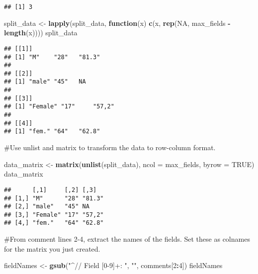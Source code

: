 \documentclass[
]{article}
\newenvironment{Shaded}{\begin{snugshade}}{\end{snugshade}}
\newcommand{\AttributeTok}[1]{\textcolor[rgb]{0.13,0.29,0.53}{#1}}
\newcommand{\ConstantTok}[1]{\textcolor[rgb]{0.56,0.35,0.01}{#1}}
\newcommand{\ControlFlowTok}[1]{\textcolor[rgb]{0.13,0.29,0.53}{\textbf{#1}}}
\newcommand{\DecValTok}[1]{\textcolor[rgb]{0.00,0.00,0.81}{#1}}
\newcommand{\FunctionTok}[1]{\textcolor[rgb]{0.13,0.29,0.53}{\textbf{#1}}}
\newcommand{\NormalTok}[1]{#1}
\newcommand{\OtherTok}[1]{\textcolor[rgb]{0.56,0.35,0.01}{#1}}
\newcommand{\SpecialCharTok}[1]{\textcolor[rgb]{0.81,0.36,0.00}{\textbf{#1}}}
\newcommand{\StringTok}[1]{\textcolor[rgb]{0.31,0.60,0.02}{#1}}
\begin{document}
\begin{verbatim}
## [1] 3
\end{verbatim}

\begin{Shaded}
\begin{Highlighting}[]
\NormalTok{split\_data }\OtherTok{\textless{}{-}} \FunctionTok{lapply}\NormalTok{(split\_data, }\ControlFlowTok{function}\NormalTok{(x) }\FunctionTok{c}\NormalTok{(x, }\FunctionTok{rep}\NormalTok{(}\ConstantTok{NA}\NormalTok{, max\_fields }\SpecialCharTok{{-}} \FunctionTok{length}\NormalTok{(x))))}
\NormalTok{split\_data}
\end{Highlighting}
\end{Shaded}

\begin{verbatim}
## [[1]]
## [1] "M"    "28"   "81.3"
## 
## [[2]]
## [1] "male" "45"   NA    
## 
## [[3]]
## [1] "Female" "17"     "57,2"  
## 
## [[4]]
## [1] "fem." "64"   "62.8"
\end{verbatim}

\#Use unlist and matrix to transform the data to row-column format.

\begin{Shaded}
\begin{Highlighting}[]
\NormalTok{data\_matrix }\OtherTok{\textless{}{-}} \FunctionTok{matrix}\NormalTok{(}\FunctionTok{unlist}\NormalTok{(split\_data), }\AttributeTok{ncol =}\NormalTok{ max\_fields, }\AttributeTok{byrow =} \ConstantTok{TRUE}\NormalTok{)}
\NormalTok{data\_matrix}
\end{Highlighting}
\end{Shaded}

\begin{verbatim}
##      [,1]     [,2] [,3]  
## [1,] "M"      "28" "81.3"
## [2,] "male"   "45" NA    
## [3,] "Female" "17" "57,2"
## [4,] "fem."   "64" "62.8"
\end{verbatim}

\#From comment lines 2-4, extract the names of the fields. Set these as
colnames for the matrix you just created.

\begin{Shaded}
\begin{Highlighting}[]
\NormalTok{fieldNames }\OtherTok{\textless{}{-}} \FunctionTok{gsub}\NormalTok{(}\StringTok{"\^{}// Field [0{-}9]+: "}\NormalTok{, }\StringTok{""}\NormalTok{, comments[}\DecValTok{2}\SpecialCharTok{:}\DecValTok{4}\NormalTok{])}
\NormalTok{fieldNames}
\end{Highlighting}
\end{Shaded}
\end{document}
